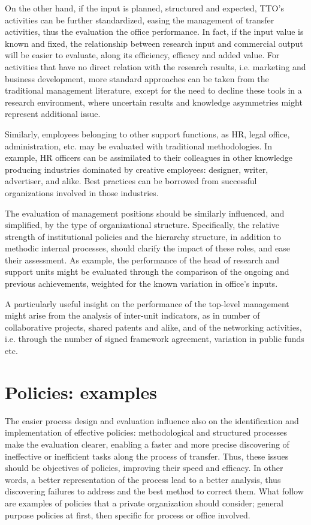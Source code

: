 On the other hand, if the input is planned, structured and expected, TTO's activities can be further standardized, easing the management of transfer activities, thus the evaluation the office performance. In fact, if the input value is known and fixed, the relationship between research input and commercial output will be easier to evaluate, along its efficiency, efficacy and added value. For activities that have no direct relation with the research results, i.e. marketing and business development, more standard approaches can be taken from the traditional management literature, except for the need to decline these tools in a research environment, where uncertain results and knowledge asymmetries might represent additional issue. 

Similarly, employees belonging to other support functions, as HR, legal office, administration, etc. may be evaluated with traditional methodologies. In example, HR officers can be assimilated to their colleagues in other knowledge producing industries dominated by creative employees: designer, writer, advertiser, and alike. Best practices can be borrowed from successful organizations involved in those industries.

The evaluation of management positions should be similarly influenced, and simplified, by the type of organizational structure. Specifically, the relative strength of institutional policies and the hierarchy structure, in addition to methodic internal processes, should clarify the impact of these roles, and ease their assessment. As example, the performance of the head of research and support units might be evaluated through the comparison of the ongoing and previous achievements, weighted for the known variation in office's inputs. 

A particularly useful insight on the performance of the top-level management might arise from the analysis of inter-unit indicators, as in number of collaborative projects, shared patents and alike, and of the networking activities, i.e. through the number of signed framework agreement, variation in public funds etc.

\section{Policies: examples} 

The easier process design and evaluation influence also on the identification and implementation of effective policies:  methodological and structured processes make the evaluation clearer, enabling a faster and more precise discovering of ineffective or inefficient tasks along the process of transfer. Thus, these issues should be objectives of policies, improving their speed and efficacy. In other words, a better representation of the process lead to a better analysis, thus discovering failures to address and the best method to correct them. What follow are examples of policies that a private organization should consider; general purpose policies at first, then specific for process or office involved.

